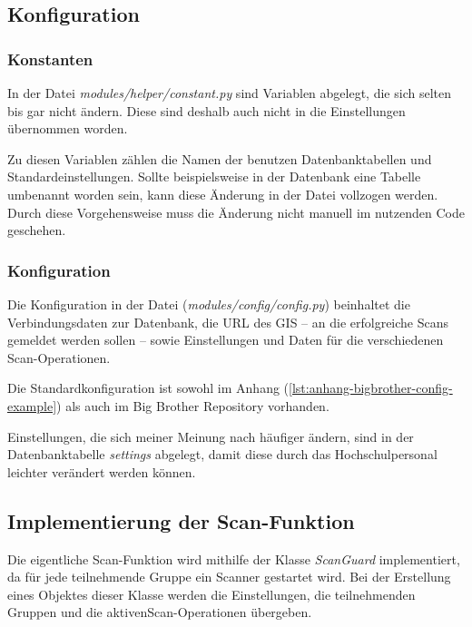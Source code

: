\subsection{Konfiguration}

\subsubsection{Konstanten}

In der Datei \textit{modules/helper/constant.py} sind Variablen abgelegt, die sich selten bis gar nicht ändern. Diese sind deshalb auch nicht in die Einstellungen übernommen worden.

Zu diesen Variablen zählen die Namen der benutzen Datenbanktabellen und Standardeinstellungen.
Sollte beispielsweise in der Datenbank eine Tabelle umbenannt worden sein, kann diese Änderung in der Datei vollzogen werden. Durch diese Vorgehensweise muss die \linebreak Änderung nicht manuell im nutzenden Code geschehen.

\subsubsection{Konfiguration}

Die Konfiguration in der Datei (\textit{modules/config/config.py}) beinhaltet die Verbindungsdaten zur Datenbank, die URL des GIS -- an die erfolgreiche Scans gemeldet werden sollen -- sowie Einstellungen und Daten für die verschiedenen Scan-Operationen.

Die Standardkonfiguration ist sowohl im Anhang (\autoref{lst:anhang-bigbrother-config-example}) als auch im Big Brother Repository vorhanden.

Einstellungen, die sich meiner Meinung nach häufiger ändern, sind in der Datenbanktabelle \textit{settings} abgelegt, damit diese durch das Hochschulpersonal leichter verändert werden \linebreak können.

\subsection{Implementierung der Scan-Funktion}

Die eigentliche Scan-Funktion wird mithilfe der Klasse \textit{ScanGuard} implementiert, da für jede teilnehmende Gruppe ein Scanner gestartet wird. Bei der Erstellung eines Objektes dieser Klasse werden die Einstellungen, die teilnehmenden Gruppen und die aktiven\linebreak Scan-Operationen übergeben.

